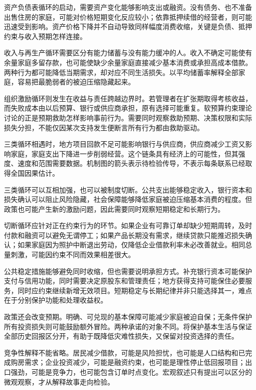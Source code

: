 \documentclass[UTF8,fontset=fandol,zihao=-4,oneside,openany]{ctexbook}
\begin{document}
\label{arg:P235}
资产负债表循环的启动，需要资产变化能够影响支出或融资。没有债务、也不准备出售住房的家庭，可能对价格短期变化反应较小；依靠抵押续借的经营者，则可能迅速受到影响。资产价格下降并不自动导致同样幅度消费收缩，关键是负债、抵押约束与收入预期怎样连接。

收入与再生产循环需要区分有能力储蓄与没有能力缓冲的人。收入不确定可能使有余量家庭多留存款，也可能使缺少余量家庭直接减少基本消费或承担高成本借款。两种行为都可能降低当期需求，却对应不同生活损失。以平均储蓄率解释全部家庭，容易把最脆弱者的被迫压缩隐藏起来。

组织激励循环则发生在收益与责任跨越边界时。若管理者在扩张期取得考核收益，而失败成本由以后预算、银行或供应商承担，原有选择可能重复。软预算约束理论讨论的正是预期救助怎样影响事前行为。需要同时观察救助预期、决策权限和实际损失分担，不能仅因某次支持发生便断言所有行为都由救助驱动。\cite{Kornai2003}

三类循环相遇时，地方项目回款不足可能影响银行与供应商，供应商减少工资又影响家庭，家庭支出下降进一步削弱经营。这个链条具有经济上的可能性，但其强度、速度和范围需要数据。机制图的箭头表示待检验传导，不表示每条联系已经取得全国因果估计。

三类循环可以互相加强，也可以被制度切断。公共支出能够稳定收入，银行资本和损失确认可以阻止风险隐藏，社会保障能够降低家庭被迫压缩基本消费的程度。但政策也可能产生新的激励问题，因此需要同时观察短期稳定和长期行为。

\label{arg:P236}
切断循环应针对正在约束行为的环节。如果企业有可靠订单却缺少短期周转，及时付款和融资可以避免无谓停工；如果产品长期没有需求，继续贷款只能推迟损失确认；如果家庭因为照护中断退出劳动，仅降低企业借款利率未必改善就业。相同总量刺激，可能因约束不同而效果相差很大。

公共稳定措施能够避免同时收缩，但也需要说明承担方式。补充银行资本可能保护支付与信用功能，同时需要决定原股东和管理责任；地方获得支持可能保住必要服务，同时应约束继续新增无效项目。短期稳定与长期纪律并非只能选择其一，难点在于分别保护功能和处理收益权。

政策还会改变预期。明确、可兑现的基本保障可能减少家庭被迫自保；无条件保护所有投资损失则可能鼓励额外冒险。两种承诺的对象不同。将保护基本生活与保证全部历史回报区分开，有助于既降低灾难性损失，又保留对投资选择的责任。

竞争性解释不能省略。居民减少借款，可能是风险担忧，也可能是人口结构和已完成购房需求；企业投资减少，可能是融资约束，也可能是理性停止低回报项目；出口强劲，可能是竞争力，也可能包含订单时点变化。宏观叙述只有提出可以区分的微观观察，才从解释故事走向检验。
\end{document}
